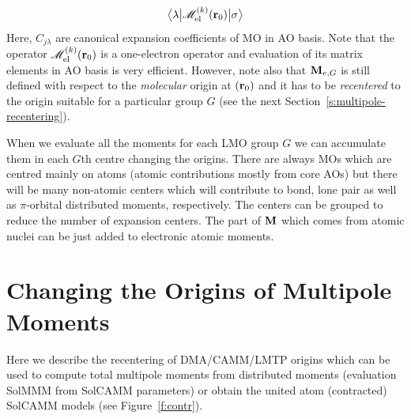 \documentclass[a4paper,titlepage,twoside,fleqn,12pt]{book}
\newcommand{\tbraket}[3]{\ensuremath{\bigl\langle {#1} \bigl\lvert {#2} \bigl\lvert {#3} \bigr\rangle}}
\begin{document}
\begin{appendices}
\begin{refsection}
\begin{equation}
   \tbraket{\lambda}{\mathscr{M}^{(k)}_{\rm el}({\bf r}_0)}{\sigma}
\end{equation}
%
Here, $C_{j\lambda}$ are canonical expansion coefficients of MO in AO basis. Note that the
operator $\mathscr{M}^{(k)}_{\rm el}({\bf r}_0)$ is a one\hyp{}electron operator
and evaluation of its matrix elements in AO basis is very efficient. However, 
note also that ${\bf M}_{e,G}$ is still defined with respect to the \emph{molecular} origin at $({\bf r}_0)$
and it has to be \emph{recentered} to the origin suitable for a particular group $G$ (see the
next Section~\ref{s:multipole-recentering}).

When we evaluate all the moments for each LMO group $G$ we can accumulate them in each $G$th centre
changing the origins. There are always MOs which are centred mainly on atoms (atomic contributions
mostly from core AOs) but there will be many non-atomic centers which will contribute to bond, lone pair
as well as $\pi$\hyp{}orbital distributed moments, respectively. The centers can be grouped to reduce the number
of expansion centers. The part of $\bf M$ which comes from atomic
nuclei can be just added to electronic atomic moments.

\section{Changing the Origins of Multipole Moments\label{s:multipole-recentering}}

Here we describe the recentering of DMA/CAMM/LMTP origins which can be used
to compute total multipole moments from distributed moments (evaluation SolMMM from SolCAMM parameters)
or obtain the united atom (contracted) SolCAMM models (see Figure~\ref{f:contr}).


\end{refsection}
\end{appendices}
\end{document}
